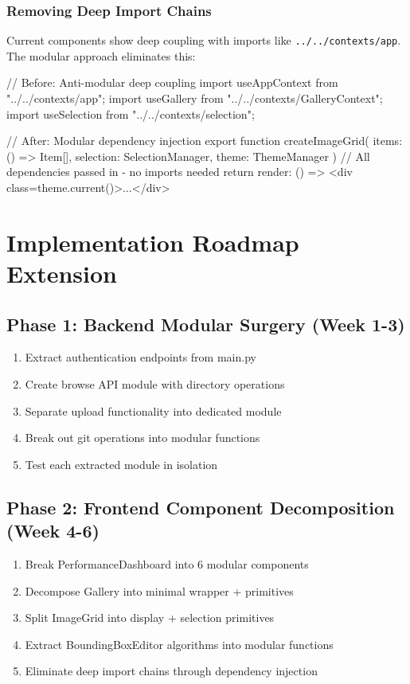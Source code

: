 \documentclass[11pt]{article}
\begin{document}
\subsubsection{Removing Deep Import Chains}

Current components show deep coupling with imports like \texttt{../../contexts/app}. The modular approach eliminates this:

\begin{typescriptcode}
// Before: Anti-modular deep coupling
import { useAppContext } from "../../contexts/app";
import { useGallery } from "../../contexts/GalleryContext";
import { useSelection } from "../../contexts/selection";

// After: Modular dependency injection
export function createImageGrid(
  items: () => Item[],
  selection: SelectionManager,
  theme: ThemeManager
) {
  // All dependencies passed in - no imports needed
  return {
    render: () => <div class={theme.current()}>...</div>
  }
}
\end{typescriptcode}

\section{Implementation Roadmap Extension}

\subsection{Phase 1: Backend Modular Surgery (Week 1-3)}

\begin{enumerate}
\item Extract authentication endpoints from main.py
\item Create browse API module with directory operations
\item Separate upload functionality into dedicated module
\item Break out git operations into modular functions
\item Test each extracted module in isolation
\end{enumerate}

\subsection{Phase 2: Frontend Component Decomposition (Week 4-6)}

\begin{enumerate}
\item Break PerformanceDashboard into 6 modular components
\item Decompose Gallery into minimal wrapper + primitives
\item Split ImageGrid into display + selection primitives
\item Extract BoundingBoxEditor algorithms into modular functions
\item Eliminate deep import chains through dependency injection
\end{enumerate}
\end{document}

